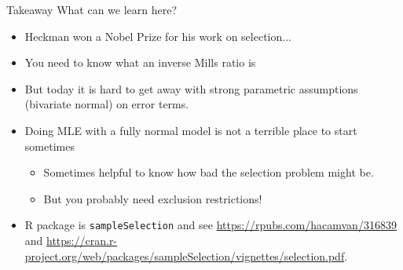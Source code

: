 \documentclass[aspectratio=169,11pt]{beamer}
\begin{document}
\begin{frame}{Takeaway}
What can we learn here?
\begin{itemize}
\item Heckman won a Nobel Prize for his work on selection...
\item You need to know what an \alert{inverse Mills ratio} is
\item But today it is hard to get away with strong parametric assumptions (bivariate normal) on error terms.
\item Doing MLE with a fully normal model is not a terrible place to start sometimes
\begin{itemize}
\item Sometimes helpful to know how bad the selection problem might be.
\item But you probably need \alert{exclusion restrictions}!
\end{itemize}
\item R package is \texttt{sampleSelection} and see \url{https://rpubs.com/hacamvan/316839} and \url{https://cran.r-project.org/web/packages/sampleSelection/vignettes/selection.pdf}.
\end{itemize}
\end{frame}
\end{document}
